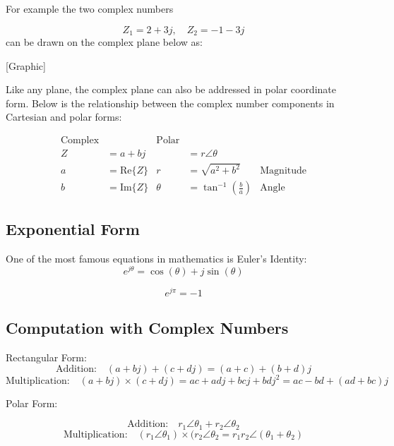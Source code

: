 For example the two complex numbers

\[
Z_1 = 2 + 3j, \quad Z_2=-1-3j
\]
can be drawn on the complex plane below as:

[Graphic]
\vspace{3.5in}

Like any plane, the complex plane can also be addressed in polar coordinate form.
Below is the relationship between the complex number components in Cartesian and
polar forms:

\vspace{0.15in}
\begin{align}
\text{Complex} &    & \text{Polar}  \\ \hline
Z &= a + bj & &= r\angle\theta \\
a &= \text{Re}\{Z\} & r &= \sqrt{a^2+b^2} & \text{Magnitude} \\
b &= \text{Im}\{Z\} & \theta &= \tan^{-1}\left(\frac{b}{a}\right) & \text{Angle}
\end{align}


\subsection{Exponential Form}

One of the most famous equations in mathematics is Euler's Identity:
\begin{equation}
\boxed{e^{j\theta} = \cos(\theta) + j\sin(\theta)}
\end{equation}

\begin{equation}
e^{j\pi} = -1
\end{equation}



\subsection{ Computation with Complex Numbers}

\noindent Rectangular Form:
\[
\text{Addition:}       \quad  (a + bj) + (c + dj) = (a+c) + (b+d)j
\]
\[
\text{Multiplication:} \quad  (a + bj) \times (c + dj) = ac + adj + bcj + bdj^2 = ac-bd + (ad+bc)j
\]

\noindent Polar Form:

\[
\text{Addition:} \quad       r_1\angle\theta_1 + r_2\angle\theta_2
\]
\[
\text{Multiplication:} \quad (r_1\angle\theta_1)\times(r_2\angle\theta_2 = r_1r_2\angle(\theta_1+\theta_2)
\]

